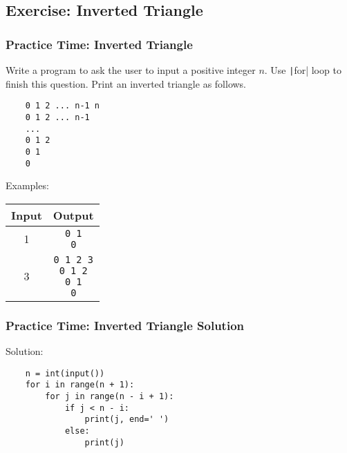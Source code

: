 \documentclass{beamer}
\newcommand{\python}[1]{\texttt|#1|}
\begin{document}
\subsection{Exercise: Inverted Triangle}
\begin{frame}[fragile]
    \frametitle{Practice Time: Inverted Triangle}

    Write a program to ask the user to input a positive integer $n$.
    Use \python{for} loop to finish this question.
    Print an inverted triangle as follows.
    \begin{verbatim}
    0 1 2 ... n-1 n
    0 1 2 ... n-1
    ...
    0 1 2
    0 1
    0
    \end{verbatim}

    Examples:
    \begin{center}
        \begin{tabular}{|c|c|}
            \hline
            Input & Output                     \\ \hline
            1     & \makecell[tl]{\texttt{0 1} \\ \texttt{0}}       \\ \hline
            3     &
            \makecell[tl]{\texttt{0 1 2 3}     \\ \texttt{0 1 2} \\ \texttt{0 1} \\ \texttt{0}}
            \\ \hline
        \end{tabular}
    \end{center}
\end{frame}
\begin{frame}[fragile]
    \frametitle{Practice Time: Inverted Triangle Solution}

    Solution:
    \begin{verbatim}
    n = int(input())
    for i in range(n + 1):
        for j in range(n - i + 1):
            if j < n - i:
                print(j, end=' ')
            else:
                print(j)
    \end{verbatim}
\end{frame}
\end{document}

